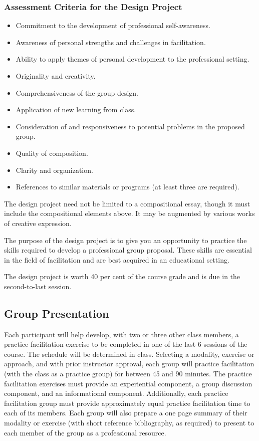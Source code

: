 \documentclass[letterpaper,10pt,headsepline]{scrreprt}
\begin{document}
\subsubsection{Assessment Criteria for the Design Project}
\begin{itemize}
\item Commitment to the development of professional self-awareness.
\item Awareness of personal strengths and challenges in facilitation.
\item Ability to apply themes of personal development to the professional setting.
\item Originality and creativity.
\item Comprehensiveness of the group design.
\item Application of new learning from class.
\item Consideration of and responsiveness to potential problems in the proposed group.
\item Quality of composition.
\item Clarity and organization.
\item References to similar materials or programs (at least three are required). 
\end{itemize}

The design project need not be limited to a compositional essay, though it must include the compositional elements above. It may be augmented by various works of creative expression.

The purpose of the design project is to give you an opportunity to practice the skills required to develop a professional group proposal. These skills are essential in the field of facilitation and are best acquired in an educational setting.

The design project is worth 40 per cent of the course grade and is due in the second-to-last session.

\subsection{Group Presentation}
Each participant will help develop, with two or three other class members, a practice facilitation exercise to be completed in one of the last 6 sessions of the course. The schedule will be determined in class. Selecting a modality, exercise or approach, and with prior instructor approval, each group will practice facilitation (with the class as a practice group) for between 45 and 90 minutes. The practice facilitation exercises must provide an experiential component, a group discussion component, and an informational component. Additionally, each practice facilitation group must provide approximately equal practice facilitation time to each of its members. Each group will also prepare a one page summary of their modality or exercise (with short reference bibliography, as required) to present to each member of the group as a professional resource.
\end{document}
